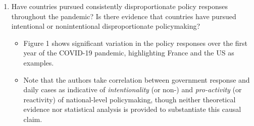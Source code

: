\documentclass[12pt,letterpaper]{article}
\begin{document}
	\begin{enumerate}
		\item Have countries pursued consistently disproportionate policy responses throughout the pandemic? Is there evidence that countries have pursued intentional or nonintentional disproportionate policymaking?
		
		\begin{itemize}
			\item Figure 1 shows significant variation in the policy responses over the first year of the COVID-19 pandemic, highlighting France and the US as examples.
			\item Note that the authors take correlation between government response and daily cases as indicative of \textit{intentionality} (or non-) and \textit{pro-activity} (or reactivity) of national-level policymaking, though neither theoretical evidence nor statistical analysis is provided to substantiate this causal claim.
			

\end{itemize}
\end{enumerate}
\end{document}

